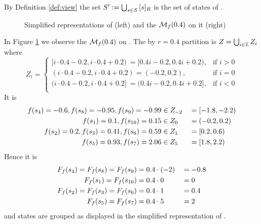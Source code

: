 \documentclass[preview]{standalone}
\begin{document}
\noindent By Definition \ref{def:view} the set ${S}' := \bigcup_{{s} \in {S}} {{[{s}]_{{R}}}}$ is the set of states of \viewprop.

\begin{figure}[!htb]
	\begin{minipage}{.6\textwidth}
		
	\end{minipage}%
	\begin{minipage}{.5\textwidth}
		
	\end{minipage}
	\caption{Simplified representations of \mdp (left) and the \viewN ${{{{{\mathcal{M}}}}_{{f}}}}(0.4)$ on it (right)}
	\label{fig:PropBeforeAfter} 
\end{figure}
\pagebreak
\begin{exmp}
	In Figure \ref{fig:PropBeforeAfter} we observe the \viewN ${{{{{\mathcal{M}}}}_{{f}}}}(0.4)$ on \chgph. The by $r=0.4$ partition is $Z = \bigcup_{i \in {\mathbb{Z}}} Z_i$ where
\[
Z_i = 
\begin{cases}
	[i \cdot 0.4 - 0.2, i \cdot 0.4 + 0.2) \:\!= [0.4i - 0.2, 0.4i + 0.2) , &\text{if } i > 0 \\
	(i \cdot 0.4 - 0.2, i \cdot 0.4 + 0.2) = (-0.2, 0.2), &\text{if } i = 0 \\
	(i \cdot 0.4 - 0.2, i \cdot 0.4 + 0.2] \:\!= (0.4i - 0.2, 0.4i + 0.2], &\text{if } i < 0 \\
\end{cases}
\]
It is 
\begin{alignat*}{3}
	{f}({s}_4)=-0.6, {f}({s}_8)=-0.95, {f}({s}_9) = -0.99 &\in Z_{-2} &&= [-1.8, -2.2) \\
	{f}({s}_1)=0.1, {f}({s}_{10})=0.15 &\in Z_0 &&= (-0.2, 0.2)\\
	{f}({s}_2)=0.2, {f}({s}_3)=0.41, {f}({s}_6) = 0.59 &\in Z_1 &&= [0.2, 0.6) \\
	{f}({s}_5)=0.93, {f}({s}_{7})=2.06 &\in Z_5 &&= [1.8, 2.2) \\
\end{alignat*}
Hence it is
\begin{alignat*}{3}
 	{\ensuremath{{F_{{f}}}}}({s}_4) = {{F_{{f}}}}({s}_{8}) = {{F_{{f}}}}({s}_{9}) &= 0.4\cdot(-2) &&= -0.8 \\
 	{{F_{{f}}}}({s}_1) = {{F_{{f}}}}({s}_{10}) &= 0.4\cdot0 &&= 0 \\
 	{{F_{{f}}}}({s}_2) = {{F_{{f}}}}({s}_{3}) = {{F_{{f}}}}({s}_{6}) &= 0.4\cdot1 &&= 0.4 \\
 	{{F_{{f}}}}({s}_5) = {{F_{{f}}}}({s}_{7}) &= 0.4\cdot5 &&= 2 \\
\end{alignat*}
and states are grouped as displayed in the simplified representation of \viewprop.
\end{exmp}
\end{document}
